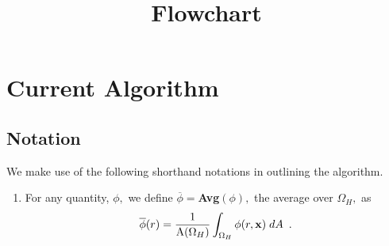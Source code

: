 \documentclass[11pt]{article}
\title{Flowchart}
\begin{document}
\maketitle
\tableofcontents
\cleardoublepage

\section{Current Algorithm}
\subsection{Notation}

We make use of the following shorthand notations in outlining the algorithm.
\begin{enumerate}

\item For any quantity, $\phi,$ we define $\overline{\phi} = ${\bf Avg}$(\phi),$ 
the average over $\Omega_H,$ as
\begin{equation}
\overline{\phi}(r) = \frac{1}{\mathrm{A}(\Omega_H)}\int_{\Omega_H} \phi(r,{\bf x}) \; dA \enskip .
\end{equation}


\end{enumerate}
\end{document}
